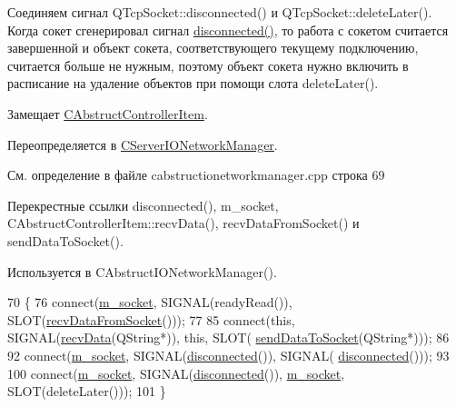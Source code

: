 Соединяем сигнал Q\+Tcp\+Socket\+::disconnected() и Q\+Tcp\+Socket\+::delete\+Later(). Когда сокет сгенерировал сигнал \hyperlink{class_c_abstruct_i_o_network_manager_a4c25afd753612c5c719944a3e8ef4373}{disconnected()}, то работа с сокетом считается завершенной и объект сокета, соответствующего текущему подключению, считается больше не нужным, поэтому объект сокета нужно включить в расписание на удаление объектов при помощи слота delete\+Later().

Замещает \hyperlink{class_c_abstruct_controller_item_a27c6889230a86cb0782e6d7596b883c1}{C\+Abstruct\+Controller\+Item}.



Переопределяется в \hyperlink{class_c_server_i_o_network_manager_a17155570c51dc951db52d827f120c689}{C\+Server\+I\+O\+Network\+Manager}.



См. определение в файле cabstructionetworkmanager.\+cpp строка 69



Перекрестные ссылки disconnected(), m\+\_\+socket, C\+Abstruct\+Controller\+Item\+::recv\+Data(), recv\+Data\+From\+Socket() и send\+Data\+To\+Socket().



Используется в C\+Abstruct\+I\+O\+Network\+Manager().


\begin{DoxyCode}
70 \{
76     connect(\hyperlink{class_c_abstruct_i_o_network_manager_a0c8754d8191c83c660f43b8c89e39d4e}{m\_socket}, SIGNAL(readyRead()), SLOT(\hyperlink{class_c_abstruct_i_o_network_manager_a78756fc08ed619162da210a9cfc09208}{recvDataFromSocket}()));
77 
85     connect(\textcolor{keyword}{this}, SIGNAL(\hyperlink{class_c_abstruct_controller_item_a6898e48061cb0cac2065f8193bd386c1}{recvData}(QString*)), \textcolor{keyword}{this}, SLOT(
      \hyperlink{class_c_abstruct_i_o_network_manager_a7e6c20ce1264c76a2cc66114f8490629}{sendDataToSocket}(QString*)));
86 
92     connect(\hyperlink{class_c_abstruct_i_o_network_manager_a0c8754d8191c83c660f43b8c89e39d4e}{m\_socket}, SIGNAL(\hyperlink{class_c_abstruct_i_o_network_manager_a4c25afd753612c5c719944a3e8ef4373}{disconnected}()), SIGNAL(
      \hyperlink{class_c_abstruct_i_o_network_manager_a4c25afd753612c5c719944a3e8ef4373}{disconnected}()));
93 
100     connect(\hyperlink{class_c_abstruct_i_o_network_manager_a0c8754d8191c83c660f43b8c89e39d4e}{m\_socket}, SIGNAL(\hyperlink{class_c_abstruct_i_o_network_manager_a4c25afd753612c5c719944a3e8ef4373}{disconnected}()), \hyperlink{class_c_abstruct_i_o_network_manager_a0c8754d8191c83c660f43b8c89e39d4e}{m\_socket}, SLOT(deleteLater()));
101 \}
\end{DoxyCode}
\hypertarget{class_c_abstruct_i_o_network_manager_a78756fc08ed619162da210a9cfc09208}{}\label{class_c_abstruct_i_o_network_manager_a78756fc08ed619162da210a9cfc09208} 
